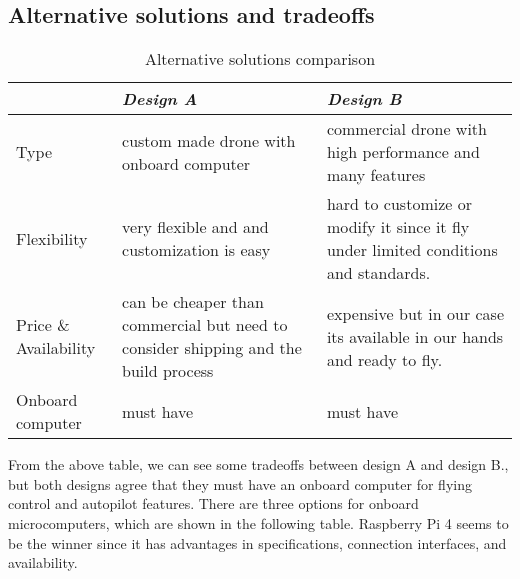 \documentclass[../main.tex]{subfiles}
\begin{document}
\subsection{Alternative solutions and tradeoffs}
\begin{table}[hbt!]
	\begin{tabular}{ | p{4cm}| p{6cm} | p{6cm} |}
		\hline
		\textit{} & \textit{Design A} & \textit{Design B}\\ \hline
		Type  & custom made drone with onboard computer & commercial drone with high performance and many features    \\ \hline
		Flexibility & very flexible and and customization is easy & hard to customize or modify it since it fly under limited conditions and standards. \\ \hline
		
		Price \& Availability & can be cheaper than commercial but need to consider
		shipping and the build process & expensive but in our case its available in our hands and ready to fly.   \\ \hline
		
		Onboard computer & must have & must have \\ \hline
		
		
		
	\end{tabular}
	\caption{Alternative solutions comparison}
\end{table} \label{tab: Alternative solutions and tradeoffs comparison }
From the above table, we can see some tradeoffs between design A and design B., but both designs agree that they must have an onboard computer for flying control and autopilot features. There are three options for onboard microcomputers, which are shown in the following table. Raspberry Pi 4 seems to be the winner since it has advantages in specifications, connection interfaces, and availability.
\end{document}
